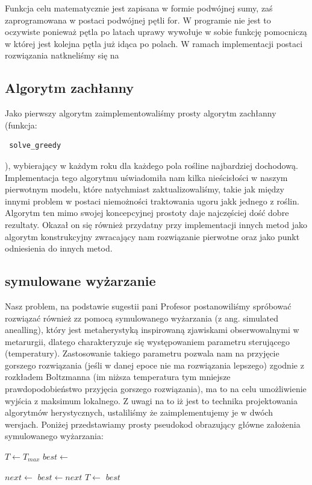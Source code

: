 \documentclass{article}
\begin{document}
Funkcja celu matematycznie jest zapisana w formie podwójnej sumy, zaś zaprogramowana w postaci podwójnej pętli for.
	W programie nie jest to oczywiste ponieważ pętla po latach uprawy wywołuje w sobie funkcję pomocniczą w której jest kolejna pętla już idąca po polach.
W ramach implementacji postaci rozwiązania natkneliśmy się na

\subsection{Algorytm zachłanny}
Jako pierwszy algorytm zaimplementowaliśmy prosty algorytm zachłanny (funkcja:\begin{verbatim} solve_greedy \end{verbatim}), wybierający w każdym roku dla każdego pola rośline najbardziej dochodową. Implementacja tego algorytmu uświadomiła nam kilka nieścisłości w naszym pierwotnym modelu, które natychmiast zaktualizowaliśmy, takie jak między innymi problem w postaci niemożności traktowania ugoru jakk jednego z roślin. Algorytm ten mimo swojej koncepcyjnej prostoty daje najczęściej dość dobre rezultaty. Okazał on się również przydatny przy implementacji innych metod jako algorytm konstrukcyjny zwracający nam rozwiązanie pierwotne oraz jako punkt odniesienia do innych metod.

\subsection{symulowane wyżarzanie}
Nasz problem, na podstawie sugestii pani Profesor postanowiliśmy spróbować rozwiązać również zz pomocą  symulowanego wyżarzania (z ang. simulated anealling), który jest metaherystyką inspirowaną zjawiskami obserwowalnymi w metarurgii, dlatego charakteryzuje się występowaniem parametru sterującego (temperatury). Zastosowanie takiego parametru pozwala nam na przyjęcie gorszego rozwiązania (jeśli w danej epoce nie ma rozwiązania lepszego) zgodnie z rozkładem Boltzmanna (im niższa temperatura tym mniejsze prawdopodobieństwo przyjęcia gorszego rozwiązania), ma to na celu umożliwienie wyjścia z maksimum lokalnego. Z uwagi na to iż jest to technika projektowania algorytmów herystycznych, ustaliliśmy że zaimplementujemy je w dwóch wersjach.
Poniżej przedstawiamy prosty pseudokod obrazujący główne założenia symulowanego wyżarzania:
\newpage

\begin{algorithmic}
\State $T\gets T_{max}$
\State $best\gets$ \textbf{}

	\State $next\gets $ \textbf{}
      \State $best\gets next$
	\EndIf
	\State $T\gets$ \textbf{}
\EndWhile
\Return $best$
\EndFunction
\end{algorithmic}
\end{document}
